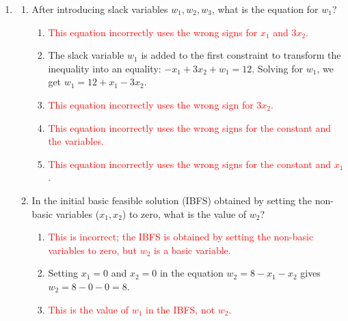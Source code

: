 \documentclass{article}%
\newcommand{\incorrect}[1]{\textcolor{red}{#1}}
\begin{document}
\begin{enumerate}
\begin{enumerate}%
\item \incorrect{$x_1$ remains in the basis after this pivot operation.}%
\item \incorrect{$x_2$ enters the basis in this iteration.}%
\item \incorrect{$w_1$ remains in the basis after this pivot operation.}%
\item Slide 12 describes the interchange of $x_2$ and $w_2$.  $x_2$ enters the basis, and $w_2$ leaves the basis.%
\item \incorrect{$w_3$ remains in the basis after this pivot operation.}%
\end{enumerate}%
\vspace{1em}%
\item%
\begin{enumerate}%
\item After introducing slack variables $w_1, w_2, w_3$, what is the equation for $w_1$?%
\begin{enumerate}%
\item \incorrect{This equation incorrectly uses the wrong signs for $x_1$ and $3x_2$.}%
\item The slack variable $w_1$ is added to the first constraint to transform the inequality into an equality: $-x_1 + 3x_2 + w_1 = 12$. Solving for $w_1$, we get $w_1 = 12 + x_1 - 3x_2$.%
\item \incorrect{This equation incorrectly uses the wrong sign for $3x_2$.}%
\item \incorrect{This equation incorrectly uses the wrong signs for the constant and the variables.}%
\item \incorrect{This equation incorrectly uses the wrong signs for the constant and $x_1$.}%
\end{enumerate}%
\vspace{0.5em}%
\item In the initial basic feasible solution (IBFS) obtained by setting the non-basic variables ($x_1, x_2$) to zero, what is the value of $w_2$?%
\begin{enumerate}%
\item \incorrect{This is incorrect; the IBFS is obtained by setting the non-basic variables to zero, but $w_2$ is a basic variable.}%
\item Setting $x_1 = 0$ and $x_2 = 0$ in the equation $w_2 = 8 - x_1 - x_2$ gives $w_2 = 8 - 0 - 0 = 8$.%
\item \incorrect{This is the value of $w_1$ in the IBFS, not $w_2$.}%

\end{enumerate}
\end{enumerate}
\end{enumerate}
\end{document}
